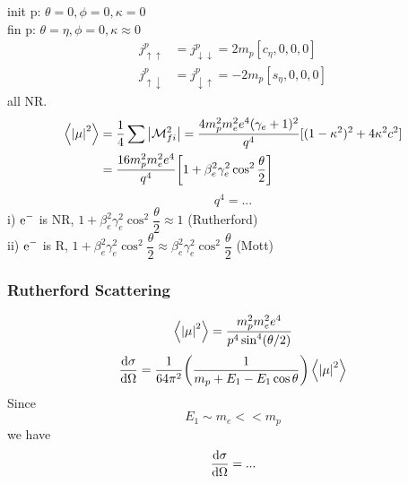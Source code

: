 \documentclass[a4paper]{article}
\numberwithin{equation}{section}
\begin{document}
init p: $ \theta = 0, \phi = 0, \kappa = 0 $\\
fin p: $ \theta = \eta, \phi = 0, \kappa \approx 0 $
\begin{equation}\label{key}
\begin{aligned}
j^p_{\uparrow\uparrow} &= j^p_{\downarrow\downarrow} = 2m_p [c_\eta, 0, 0, 0]\\
j^p_{\uparrow\downarrow} &= j^p_{\downarrow\uparrow} = -2m_p [s_\eta, 0, 0, 0]
\end{aligned}
\end{equation}
all NR.\\
\begin{equation}\label{key}
\begin{aligned}
\ev{\abs{\mu}^2} &= \dfrac{1}{4}\sum \abs{\mathcal{M}_{fi}^2} = \dfrac{4m_p^2 m_e^2 e^4(\gamma_e+1)^2}{q^4} [(1-\kappa^2)^2 + 4\kappa^2c^2]\\
&= \dfrac{16m_p^2 m_e^2 e^4}{q^4} \qty[1 + \beta_e^2 \gamma_e^2 \cos^2\dfrac{\theta}{2}]\\
\end{aligned}
\end{equation}
\begin{equation}\label{key}
q^4 = ...
\end{equation}
i) $ \ce{e^-} $ is NR, $ 1 + \beta_e^2 \gamma_e^2 \cos^2\dfrac{\theta}{2} \approx 1 $ (Rutherford)\\
ii) $ \ce{e^-} $ is R, $ 1 + \beta_e^2 \gamma_e^2 \cos^2\dfrac{\theta}{2} \approx \beta_e^2 \gamma_e^2 \cos^2\dfrac{\theta}{2} $ (Mott)\\

\subsubsection{Rutherford Scattering}
\begin{equation}\label{key}
\ev{\abs{\mu}^2} = \dfrac{m_p^2 m_e^2 e^4}{p^4 \sin^4 (\theta/2)}
\end{equation}
\begin{equation}\label{key}
\dv{\sigma}{\Omega} = \dfrac{1}{64\pi^2} \qty(\dfrac{1}{m_p + E_1 - E_1\cos\theta}) \ev{\abs{\mu}^2}
\end{equation}
Since
\begin{equation}\label{key}
E_1 \sim m_e << m_p
\end{equation}
we have
\begin{equation}\label{key}
\dv{\sigma}{\Omega} = ...
\end{equation}
\end{document}

